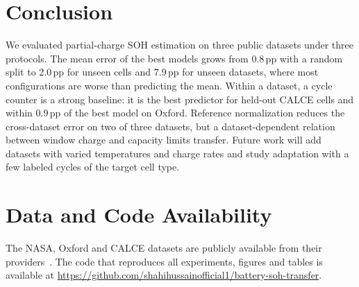 \documentclass[conference]{IEEEtran}
\begin{document}
\section{Conclusion}
We evaluated partial-charge SOH estimation on three public datasets under three protocols. The mean error of the best models grows from 0.8\,pp with a random split to 2.0\,pp for unseen cells and 7.9\,pp for unseen datasets, where most configurations are worse than predicting the mean. Within a dataset, a cycle counter is a strong baseline: it is the best predictor for held-out CALCE cells and within 0.9\,pp of the best model on Oxford. Reference normalization reduces the cross-dataset error on two of three datasets, but a dataset-dependent relation between window charge and capacity limits transfer. Future work will add datasets with varied temperatures and charge rates and study adaptation with a few labeled cycles of the target cell type.

\section*{Data and Code Availability}
The NASA, Oxford and CALCE datasets are publicly available from their providers~\cite{saha2007nasa,birkl2017oxforddata,calcearchive}. The code that reproduces all experiments, figures and tables is available at \url{https://github.com/shahihussainofficial1/battery-soh-transfer}.



\end{document}

